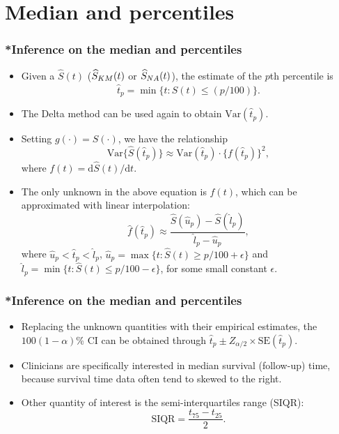 \documentclass[10pt]{beamer}\usepackage[]{graphicx}\usepackage[]{color}
\newcommand{\dif}{\mathrm{d}}
\newcommand{\tp}{\hat t_p}
\newcommand{\Var}{\mathrm{Var}}
\newcommand{\SE}{\mathrm{SE}}
\newcommand{\Ss}{\widehat{S}}
\newcommand{\Skm}{\widehat{S}_{\scriptsize{KM}}}
\newcommand{\Sna}{\widehat{S}_{\scriptsize{NA}}}
\begin{document}
\section{Median and percentiles}
\begin{frame}
  \frametitle{*Inference on the median and percentiles}
  \begin{itemize}
  \item Given a $\Ss(t)$ ($\Skm(t)$ or $\Sna(t)$), the estimate of the $p$th percentile is 
    $$ \tp = \min\{t: \hat{S}(t) \le (p / 100)\}.$$
  \item The Delta method can be used again to obtain $\Var(\tp)$.
  \item Setting $g(\cdot) = S(\cdot)$, we have the relationship
    \begin{equation*}
    \Var\{\Ss(\tp)\} \approx \Var(\tp) \cdot \{f(\tp)\}^2,
    \label{eq:mp}
    \end{equation*}
    where $f(t) = \dif \Ss(t) / \dif t$.
  \item The only unknown in the above equation is $f(t)$, 
    which can be approximated with linear interpolation:
    $$\hat f(\tp) \approx\frac{\Ss(\hat u_p) - \Ss(\hat l_p)}{\hat l_p - \hat u_p}, $$
    where $\hat u_p < \tp < \hat l_p$, $\hat u_p = \max\{t:\Ss(t) \ge p / 100 + \epsilon\}$ and 
    $\hat l_p = \min\{t:\Ss(t) \le p / 100 - \epsilon\}$, for some small constant $\epsilon$.
  \end{itemize}
\end{frame}

\begin{frame}[fragile]
  \frametitle{*Inference on the median and percentiles}
  \begin{itemize}
  \item Replacing the unknown quantities with their empirical estimates, 
    the $100(1-\alpha)$\% CI can be obtained through
    $\tp \pm Z_{\alpha/2}\times\SE(\tp)$.
  \item Clinicians are specifically interested in median survival (follow-up) time, 
    because survival time data often tend to skewed to the right.
  \item Other quantity of interest is the semi-interquartiles range (SIQR):
    $$\mbox{SIQR} = \frac{t_{75} - t_{25}}{2}.$$
  \end{itemize}
\end{frame}
\end{document}
